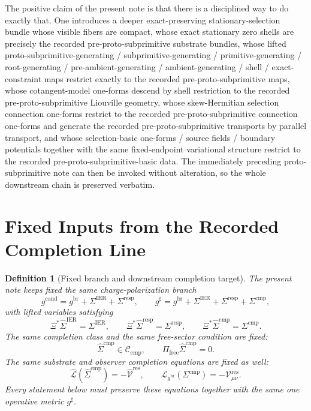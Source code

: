 \documentclass[11pt]{article}
\newcommand{\ObserverMap}{\Xi}
\newcommand{\ObserverMetric}{g^{\mathrm{br}}}
\newcommand{\CandidateMetric}{g^{\mathrm{cand}}}
\newcommand{\CompletedMetric}{g^{\sharp}}
\newcommand{\BaseShift}{\Sigma^{\mathrm{IER}}}
\newcommand{\ResponseShift}{\Sigma^{\mathrm{resp}}}
\newcommand{\CompShift}{\Sigma^{\mathrm{cmp}}}
\newcommand{\BaseLift}{\widehat\Sigma^{\mathrm{IER}}}
\newcommand{\ResponseLift}{\widehat\Sigma^{\mathrm{resp}}}
\newcommand{\CompLift}{\widehat\Sigma^{\mathrm{cmp}}}
\newcommand{\ResidualCore}{\mathcal V_{\mu\nu}^{\mathrm{res}}}
\newcommand{\ResidualLift}{\widehat{\mathcal V}^{\mathrm{res}}}
\newcommand{\SubReducedEin}{\widehat{\mathcal L}}
\newcommand{\FreeProj}{\Pi_{\mathrm{free}}}
\newcommand{\ReducedEin}{\mathcal L_{\ObserverMetric}}
\newcommand{\CompClass}{\mathscr C_{\mathrm{cmp}}}
\newtheorem{definition}{Definition}
\begin{document}
The positive claim of the present note is that there is a disciplined way to do exactly that. One introduces a deeper exact-preserving stationary-selection bundle whose visible fibers are compact, whose exact stationary zero shells are precisely the recorded pre-proto-subprimitive substrate bundles, whose lifted proto-subprimitive-generating / subprimitive-generating / primitive-generating / root-generating / pre-ambient-generating / ambient-generating / shell / exact-constraint maps restrict exactly to the recorded pre-proto-subprimitive maps, whose cotangent-model one-forms descend by shell restriction to the recorded pre-proto-subprimitive Liouville geometry, whose skew-Hermitian selection connection one-forms restrict to the recorded pre-proto-subprimitive connection one-forms and generate the recorded pre-proto-subprimitive transports by parallel transport, and whose selection-basic one-forms / source fields / boundary potentials together with the same fixed-endpoint variational structure restrict to the recorded pre-proto-subprimitive-basic data. The immediately preceding proto-subprimitive note can then be invoked without alteration, so the whole downstream chain is preserved verbatim.

\section{Fixed Inputs from the Recorded Completion Line}

\begin{definition}[Fixed branch and downstream completion target]
\label{def:fixed_branch}
The present note keeps fixed the same charge-polarization branch
\begin{equation}
\CandidateMetric
=
\ObserverMetric+\BaseShift+\ResponseShift,
\qquad
\CompletedMetric
=
\ObserverMetric+\BaseShift+\ResponseShift+\CompShift,
\label{eq:fixed_metrics}
\end{equation}
with lifted variables satisfying
\begin{equation}
\ObserverMap^*\BaseLift=\BaseShift,
\qquad
\ObserverMap^*\ResponseLift=\ResponseShift,
\qquad
\ObserverMap^*\CompLift=\CompShift.
\label{eq:fixed_lifts}
\end{equation}
The same completion class and the same free-sector condition are fixed:
\begin{equation}
\CompLift\in\CompClass,
\qquad
\FreeProj\CompLift=0.
\label{eq:fixed_free}
\end{equation}
The same substrate and observer completion equations are fixed as well:
\begin{equation}
\SubReducedEin(\CompLift)=-\ResidualLift,
\qquad
\ReducedEin(\CompShift)=-\ResidualCore.
\label{eq:fixed_solves}
\end{equation}
Every statement below must preserve these equations together with the same one operative metric \(\CompletedMetric\).
\end{definition}
\end{document}
